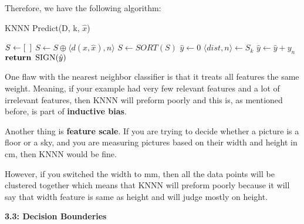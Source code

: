 \documentclass{article}
\begin{document}
\vspace{0.5cm}

\newpage

Therefore, we have the following algorithm:


\begin{algorithm}
\caption{KNNN Predict(D, k, $\hat{x}$)}\label{euclid}
\begin{algorithmic}[1]
\State $S \gets [\hspace{0.5em}]$ %
\State $S \gets S \oplus \langle d(x,\hat{x}), n \rangle $ 
\EndFor
\State $S \gets SORT(S)$ 
\State $\hat{y} \gets 0$
 
\State $\langle dist,n \rangle \gets S_k $
\State $\hat{y} \gets \hat{y} + y_n$ 
\EndFor
\State $\textbf{return} \hspace{0.5em} \text{SIGN}(\hat{y})$ 
\EndProcedure
\end{algorithmic}
\end{algorithm}

\vspace{0.5cm}

One flaw with the nearest neighbor classifier is that it treats all features the same weight. Meaning, if your example had very few relevant features and a lot of irrelevant features, then KNNN will preform poorly
and this is, as mentioned before, is part of \textbf{inductive bias}.
\vspace{0.5cm}

Another thing is \textbf{feature scale}. If you are trying to decide whether a picture is a floor or a sky, and you are measuring pictures based on their width and height in cm, then KNNN would be fine.

\vspace{0.5cm}

However, if you switched the width to mm, then all the data points will be clustered together which means that KNNN  will preform poorly because it will say that width feature is same as height and will judge mostly on height.

\newpage

\LARGE \textbf{3.3: Decision Bounderies}

\vspace{0.7cm}
\end{document}
